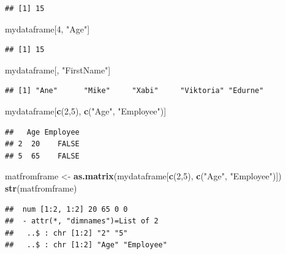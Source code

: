 \documentclass[]{book}
\newenvironment{Shaded}{\begin{snugshade}}{\end{snugshade}}
\newcommand{\KeywordTok}[1]{\textcolor[rgb]{0.13,0.29,0.53}{\textbf{{#1}}}}
\newcommand{\DecValTok}[1]{\textcolor[rgb]{0.00,0.00,0.81}{{#1}}}
\newcommand{\StringTok}[1]{\textcolor[rgb]{0.31,0.60,0.02}{{#1}}}
\newcommand{\NormalTok}[1]{{#1}}
\begin{document}
\begin{verbatim}
## [1] 15
\end{verbatim}

\begin{Shaded}
\begin{Highlighting}[]
\NormalTok{mydataframe[}\DecValTok{4}\NormalTok{, }\StringTok{"Age"}\NormalTok{]}
\end{Highlighting}
\end{Shaded}

\begin{verbatim}
## [1] 15
\end{verbatim}

\begin{Shaded}
\begin{Highlighting}[]
\NormalTok{mydataframe[, }\StringTok{"FirstName"}\NormalTok{]}
\end{Highlighting}
\end{Shaded}

\begin{verbatim}
## [1] "Ane"      "Mike"     "Xabi"     "Viktoria" "Edurne"
\end{verbatim}

\begin{Shaded}
\begin{Highlighting}[]
\NormalTok{mydataframe[}\KeywordTok{c}\NormalTok{(}\DecValTok{2}\NormalTok{,}\DecValTok{5}\NormalTok{), }\KeywordTok{c}\NormalTok{(}\StringTok{"Age"}\NormalTok{, }\StringTok{"Employee"}\NormalTok{)]}
\end{Highlighting}
\end{Shaded}

\begin{verbatim}
##   Age Employee
## 2  20    FALSE
## 5  65    FALSE
\end{verbatim}

\begin{Shaded}
\begin{Highlighting}[]
\NormalTok{matfromframe <-}\StringTok{ }\KeywordTok{as.matrix}\NormalTok{(mydataframe[}\KeywordTok{c}\NormalTok{(}\DecValTok{2}\NormalTok{,}\DecValTok{5}\NormalTok{), }\KeywordTok{c}\NormalTok{(}\StringTok{"Age"}\NormalTok{, }\StringTok{"Employee"}\NormalTok{)])}
\KeywordTok{str}\NormalTok{(matfromframe)}
\end{Highlighting}
\end{Shaded}

\begin{verbatim}
##  num [1:2, 1:2] 20 65 0 0
##  - attr(*, "dimnames")=List of 2
##   ..$ : chr [1:2] "2" "5"
##   ..$ : chr [1:2] "Age" "Employee"
\end{verbatim}
\end{document}
